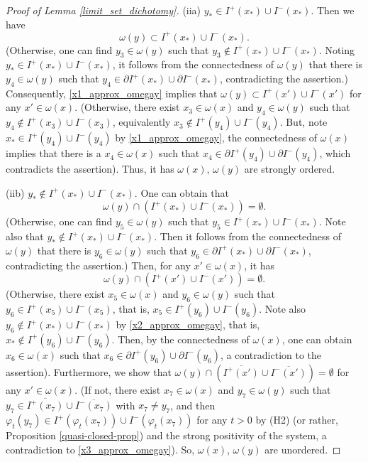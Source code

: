 \documentclass[10pt,a4paper]{amsart}
\begin{document}
\begin{proof}[Proof of Lemma \ref{limit_set_dichotomy}]
	(iia) $y_*\in I^{+}(x_*)\cup I^{-}(x_*)$. Then we have
	\begin{equation}\label{x1_approx_omegay}
		\omega(y)\subset I^{+}(x_*)\cup I^{-}(x_*).
	\end{equation}
	(Otherwise, one can find $y_3\in\omega(y)$ such that $y_3\notin I^{+}(x_*)\cup I^{-}(x_*)$. Noting $y_*\in I^{+}(x_*)\cup I^{-}(x_*)$, it follows from the connectedness of $\omega(y)$ that there is $y_4\in\omega(y)$ such that $y_4\in\partial I^{+}(x_*)\cup \partial I^{-}(x_*)$, contradicting the assertion.)
	Consequently, \eqref{x1_approx_omegay} implies that $\omega(y)\subset I^{+}(x')\cup I^{-}(x')$ for any $x'\in \omega(x)$.
	(Otherwise, there exist $x_3\in\omega(x)$ and $y_4\in\omega(y)$ such that $y_4\notin I^{+}(x_3)\cup I^{-}(x_3)$, equivalently $x_3\notin I^{+}(y_4)\cup I^{-}(y_4)$. But, note $x_*\in I^{+}(y_4)\cup I^{-}(y_4)$ by \eqref{x1_approx_omegay}, the connectedness of $\omega(x)$ implies that there is a $x_4\in\omega(x)$ such that $x_4\in \partial I^{+}(y_4)\cup \partial I^{-}(y_4)$, which contradicts the assertion). Thus, it has $\omega(x)$, $\omega(y)$ are strongly ordered.
		
	(iib) $y_*\notin I^{+}(x_*)\cup I^{-}(x_*)$. One can obtain that 
    \begin{equation}\label{x2_approx_omegay}
		\omega(y)\cap (I^{+}(x_*)\cup I^{-}(x_*))=\emptyset.
	\end{equation}
    (Otherwise, one can find $y_5\in\omega(y)$ such that $y_5\in I^{+}(x_*)\cup I^{-}(x_*)$. Note also that $y_*\notin I^{+}(x_*)\cup I^{-}(x_*)$. Then it follows from the connectedness of $\omega(y)$ that there is $y_6\in\omega(y)$ such that $y_6\in \partial I^{+}(x_*)\cup \partial I^{-}(x_*)$, contradicting the assertion.) 
    Then, for any $x'\in\omega(x)$, it has 
    \begin{equation}\label{x3_approx_omegay}
        \omega(y)\cap (I^{+}(x')\cup I^{-}(x'))=\emptyset.
    \end{equation} (Otherwise, there exist $x_5\in\omega(x)$ and $y_6\in\omega(y)$ such that $y_6\in I^{+}(x_5)\cup I^{-}(x_5)$, that is, $x_5\in I^{+}(y_6)\cup I^{-}(y_6)$. Note also $y_6\notin I^{+}(x_*)\cup I^{-}(x_*)$ by \eqref{x2_approx_omegay}, that is, $x_*\notin I^{+}(y_6)\cup I^{-}(y_6)$. 
    Then, by the connectedness of $\omega(x)$, one can obtain $x_6\in\omega(x)$ such that $x_6\in \partial I^{+}(y_6)\cup \partial I^{-}(y_6)$, a contradiction to the assertion). Furthermore, we show that $\omega(y)\cap (\overline{I^{+}(x')}\cup \overline{I^{-}(x')})=\emptyset$ for any $x'\in\omega(x)$. (If not, there exist $x_7\in\omega(x)$ and $y_7\in\omega(y)$ such that $y_7\in \overline{I^{+}(x_7)}\cup \overline{I^{-}(x_7)}$ with $x_7\neq y_7$, and then $\varphi_t(y_7)\in I^{+}(\varphi_t(x_7))\cup I^{-}(\varphi_t(x_7))$ for any $t>0$ by (H2) (or rather, Proposition \ref{quasi-closed-prop}) and the strong positivity of the system, a contradiction to \eqref{x3_approx_omegay}). So, $\omega(x)$, $\omega(y)$ are unordered.
    

\end{proof}
\end{document}
